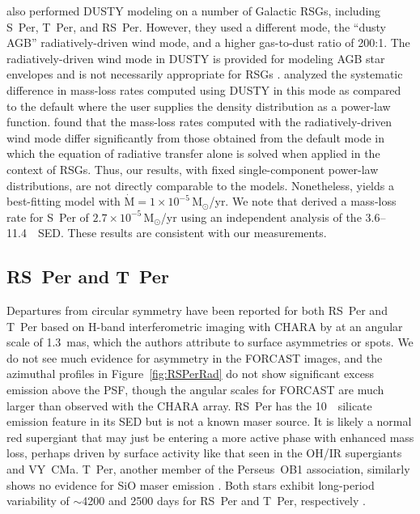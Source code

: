 \documentclass[modern]{aastex61}
\begin{document}
\cite{fok2012} also performed DUSTY modeling on a number of Galactic RSGs, including S~Per, T~Per, and RS~Per.  However, they used a different mode, the ``dusty AGB'' radiatively-driven wind mode, and a higher gas-to-dust ratio of 200:1.  The radiatively-driven wind mode in DUSTY is provided for modeling AGB star envelopes and is not necessarily appropriate for RSGs \citep[e.g.,][]{heras2005}. \cite{groenewegen2012} analyzed the systematic difference in mass-loss rates computed using DUSTY in this mode as compared to the default where the user supplies the density distribution as a power-law function. \cite{groenewegen2012} found that the mass-loss rates computed with the radiatively-driven wind mode differ significantly from those obtained from the default mode in which the equation of radiative transfer alone is solved when applied in the context of RSGs.  Thus, our results, with fixed single-component power-law distributions, are not directly comparable to the \cite{fok2012} models.  Nonetheless, \cite{fok2012} yields a best-fitting model with $\dot{\mathrm{M}}=1\times10^{-5}\,\mathrm{M}_\odot$/yr. We note that \cite{gehrz1971} derived a mass-loss rate for S~Per of $2.7\times10^{-5}\,\mathrm{M}_\odot$/yr using an independent analysis of the 3.6--11.4~\micron\ SED. These results are consistent with our measurements.



\subsection{RS~Per and T~Per}\label{sec:rsper}
Departures from circular symmetry have been reported for both RS~Per and T~Per based on H-band interferometric imaging with CHARA by \cite{baron2014} at an angular scale of 1.3~mas, which the authors attribute to surface asymmetries or spots.  We do not see much evidence for asymmetry in the FORCAST images, and the azimuthal profiles in Figure~\ref{fig:RSPerRad} do not show significant excess emission above the PSF, though the angular scales for FORCAST are much larger than \cite{baron2014} observed with the CHARA array.  RS~Per has the 10~\micron\ silicate emission feature in its SED but is not a known maser source. It is likely a normal red supergiant that may just be entering a more active phase with enhanced mass loss, perhaps driven by surface activity like that seen in the OH/IR supergiants and VY~CMa. T~Per, another member of the Perseus~OB1 association, similarly shows no evidence for SiO maser emission \citep{jiang1999}. Both stars exhibit long-period variability of $\sim$4200 and 2500 days for RS~Per and T~Per, respectively \citep[AAVSO;][]{kiss2006}.
\end{document}
